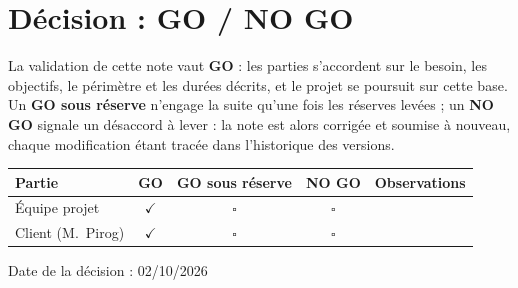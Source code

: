 \section{Décision : GO / NO GO}

La validation de cette note vaut \textbf{GO} : les parties s'accordent sur le besoin, les objectifs, le périmètre et les durées décrits, et le projet se poursuit sur cette base. Un \textbf{GO sous réserve} n'engage la suite qu'une fois les réserves levées ; un \textbf{NO GO} signale un désaccord à lever : la note est alors corrigée et soumise à nouveau, chaque modification étant tracée dans l'historique des versions.

\begin{tabular}{|p{3.4cm}|c|c|c|p{4.4cm}|}
\hline
\textbf{Partie} & \textbf{GO} & \textbf{GO sous réserve} & \textbf{NO GO} & \textbf{Observations} \\ \hline
Équipe projet & $\checkmark$ & $\square$ & $\square$ & \rule{0pt}{0.9cm} \\ \hline
Client (M.~Pirog) & $\checkmark$ & $\square$ & $\square$ & \rule{0pt}{0.9cm} \\ \hline
\end{tabular}

\medskip

Date de la décision : 02/10/2026 {\hrulefill}

